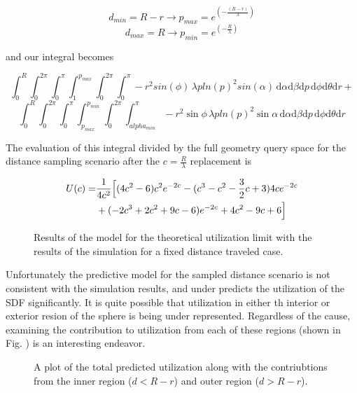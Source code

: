 $$ d_{min} = R-r \rightarrow p_{max} = e^{(-\frac{(R-r)}{\lambda})} $$
$$ d_{max} = R   \rightarrow p_{min} = e^{(-\frac{R}{\lambda})} $$

and our integral becomes

$$ \int_{0}^{R}\int_{0}^{2\pi}\int_{0}^{\pi}\int_{1}^{p_{max}}\int_{0}^{2\pi}\int_{0}^{\pi}
-r^2sin(\phi) \, \lambda p ln(p)^2 sin(\alpha) \, \mathrm{d}\alpha \mathrm{d}\beta \mathrm{d}p \, \mathrm{d}\phi
\mathrm{d}\theta \mathrm{d}r + $$
$$ \int_{0}^{R}\int_{0}^{2\pi}\int_{0}^{\pi}\int_{p_{max}}^{p_{min}}\int_{0}^{2\pi}\int_{alpha_{min}}^{\pi}
-r^2\sin{\phi} \, \lambda p ln(p)^2 \sin{\alpha} \, \mathrm{d}\alpha \mathrm{d}\beta \mathrm{d}p \, \mathrm{d}\phi
\mathrm{d}\theta \mathrm{d}r $$

The evaluation of this integral divided by the full geometry query space for the
distance sampling scenario after the $c=\frac{R}{\lambda}$ replacement is

\begin{align*}
  U(c) = &\frac{1}{4c^{2}} \Big{[} (4 c^2-6) c^2e^{-2c} - (c^3-c^2-\frac{3}{2} c+3)4ce^{-2c} \\
    &+ (-2 c^3+2c^2+9c-6) e^{-2c}+4c^2-9 c+6 \Big{]}
\end{align*}

\begin{figure}[ht] 
\centering
{\textwidth}
\caption{Results of the model for the theoretical utilization limit with the
  results of the simulation for a fixed distance traveled case.}
\label{fig:sdf_sampled_dist}
\end{figure}

Unfortunately the predictive model for the sampled distance scenario is not
consistent with the simulation results, and under predicts the utilization of
the SDF significantly. It is quite possible that utilization in either th interior or exterior
resion of the sphere is being under represented. Regardless of the cause, examining the contribution to
utilization from each of these regions (shown in
Fig. \label{fig:util_region_contributions}) is an interesting endeavor.


\begin{figure}[ht] 
\centering
{\textwidth}
\caption{A plot of the total predicted utilization along with the contriubtions
  from the inner region ($d < R-r$) and outer region ($d > R-r$).}
\label{fig:util_region_contributions}
\end{figure}

